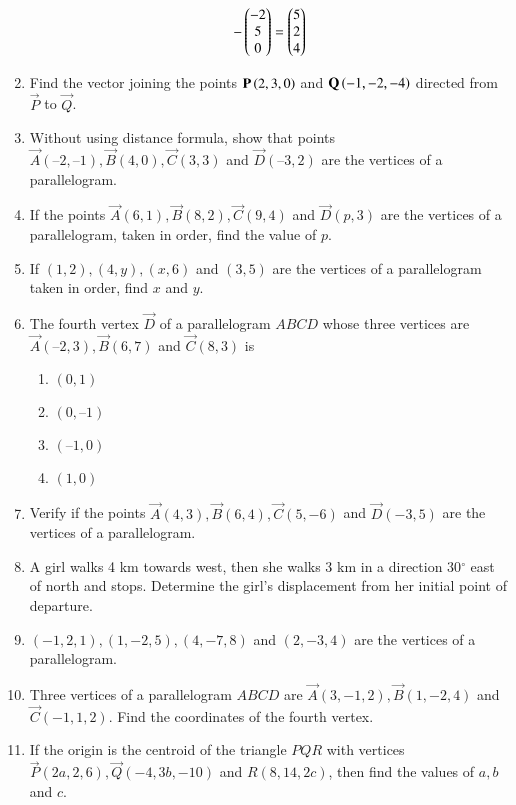 \begin{enumerate}[label=\thesubsection.\arabic*, ref=\thesubsection.\theenumi]
\begin{align}
	-\begin{pmatrix}-2 \\ 5 \\ 0\end{pmatrix} = 
	\begin{pmatrix}5 \\ 2 \\ 4\end{pmatrix}  
\end{align}
\item Find the vector joining the points $\mathbf{P}\left(2, 3, 0\right)$ and $\mathbf{Q}\left(-1, -2, -4\right)$ directed from $\vec{P}$ to $\vec{Q}$.
\item Without using distance formula,  show that points $\vec{A}(– 2,  – 1),  \vec{B}(4,  0),  \vec{C}(3,  3)$ and $\vec{D}(–3,  2)$ are the vertices of a parallelogram.
\label{chapters/11/10/1/9}
\\
\solution

\item If the points $\vec{A}(6,  1),  \vec{B}(8,  2),  \vec{C}(9,  4)$ and $\vec{D}(p,  3)$ are the vertices of a parallelogram,  taken in order,  find the value of $p$.
\label{10/7/0/10}
\item 
If $(1,  2),  (4,  y),  (x,  6)$ and $(3,  5)$ are the vertices of a parallelogram taken in order,  find $x$ and $y$.
\label{10/7/2/6}
\item The fourth vertex $\vec{D}$ of a parallelogram $ABCD$ whose three vertices are
	$\vec{A} (–2,  3),  \vec{B} (6,  7)$ and  $\vec{C} (8,  3)$ is
\begin{enumerate}
	\item $(0,  1)$
	\item $(0,  –1)$
	\item $ (–1, 0)$
	\item$(1,  0)$
\end{enumerate}
\item Verify if the points $\vec{A}(4, 3),  \vec{B}(6, 4), \vec{C}(5, -6)$  and  $\vec{D}(-3, 5)$ are the vertices of a parallelogram.
\item A girl walks 4 km towards west,  then she walks 3 km in a direction 30$^{\circ}$ east of north and stops. Determine the girl's displacement from her initial point of departure.\\
	\solution
		
\item $(-1, 2, 1),  (1, -2, 5),  (4, -7, 8)$ and $(2, -3, 4)$ are the vertices of a parallelogram.
\item Three vertices of a parallelogram $ABCD$ are $\vec{A}(3, -1, 2),  \vec{B}(1, -2, 4)$ and $\vec{C}(-1, 1, 2)$. Find the coordinates of the fourth vertex.
\item If the origin is the centroid of the triangle $PQR$ with vertices $\vec{P}(2a, 2, 6),  \vec{Q}(-4, 3b, -10)$ and $R(8, 14, 2c)$,  then find the values of $a,  b$ and $c$.

\end{enumerate}
